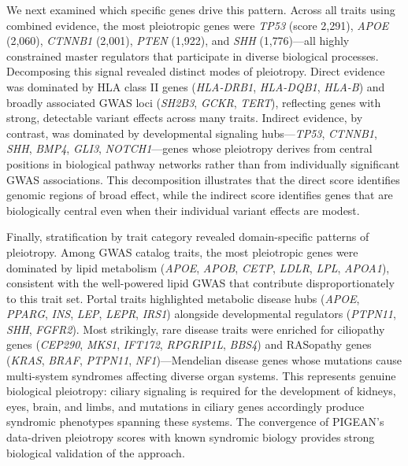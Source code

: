 We next examined which specific genes drive this pattern. Across all traits using combined evidence, the most pleiotropic genes were \textit{TP53} (score 2{,}291), \textit{APOE} (2{,}060), \textit{CTNNB1} (2{,}001), \textit{PTEN} (1{,}922), and \textit{SHH} (1{,}776)---all highly constrained master regulators that participate in diverse biological processes. Decomposing this signal revealed distinct modes of pleiotropy. Direct evidence was dominated by HLA class II genes (\textit{HLA-DRB1}, \textit{HLA-DQB1}, \textit{HLA-B}) and broadly associated GWAS loci (\textit{SH2B3}, \textit{GCKR}, \textit{TERT}), reflecting genes with strong, detectable variant effects across many traits. Indirect evidence, by contrast, was dominated by developmental signaling hubs---\textit{TP53}, \textit{CTNNB1}, \textit{SHH}, \textit{BMP4}, \textit{GLI3}, \textit{NOTCH1}---genes whose pleiotropy derives from central positions in biological pathway networks rather than from individually significant GWAS associations. This decomposition illustrates that the direct score identifies genomic regions of broad effect, while the indirect score identifies genes that are biologically central even when their individual variant effects are modest.

Finally, stratification by trait category revealed domain-specific patterns of pleiotropy. Among GWAS catalog traits, the most pleiotropic genes were dominated by lipid metabolism (\textit{APOE}, \textit{APOB}, \textit{CETP}, \textit{LDLR}, \textit{LPL}, \textit{APOA1}), consistent with the well-powered lipid GWAS that contribute disproportionately to this trait set. Portal traits highlighted metabolic disease hubs (\textit{APOE}, \textit{PPARG}, \textit{INS}, \textit{LEP}, \textit{LEPR}, \textit{IRS1}) alongside developmental regulators (\textit{PTPN11}, \textit{SHH}, \textit{FGFR2}). Most strikingly, rare disease traits were enriched for ciliopathy genes (\textit{CEP290}, \textit{MKS1}, \textit{IFT172}, \textit{RPGRIP1L}, \textit{BBS4}) and RASopathy genes (\textit{KRAS}, \textit{BRAF}, \textit{PTPN11}, \textit{NF1})---Mendelian disease genes whose mutations cause multi-system syndromes affecting diverse organ systems. This represents genuine biological pleiotropy: ciliary signaling is required for the development of kidneys, eyes, brain, and limbs, and mutations in ciliary genes accordingly produce syndromic phenotypes spanning these systems. The convergence of PIGEAN's data-driven pleiotropy scores with known syndromic biology provides strong biological validation of the approach.


